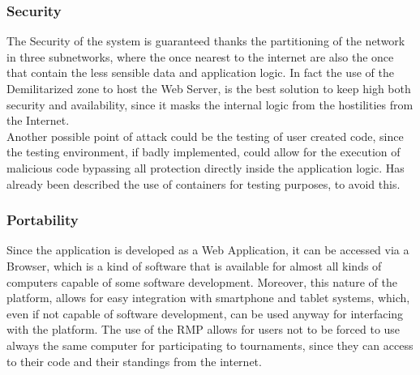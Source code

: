 \subsubsection{Security}
The Security of the system is guaranteed thanks the partitioning of the network in three subnetworks, where the once nearest to the internet are also the once that contain the less sensible data and application logic. In fact the use of the Demilitarized zone to host the Web Server, is the best solution to keep high both security and availability, since it masks the internal logic from the hostilities from the Internet.\\ 
Another possible point of attack could be the testing of user created code, since the testing environment, if badly implemented, could allow for the execution of malicious code bypassing all protection directly inside the application logic. 
Has already been described the use of containers for testing purposes, to avoid this.
\subsubsection{Portability}
Since the application is developed as a Web Application, it can be accessed via a Browser, which is a kind of software that is available for almost all kinds of computers capable of some software development. 
Moreover, this nature of the platform, allows for easy integration with smartphone and tablet systems, which, even if not capable of software development, can be used anyway for interfacing with the platform.
The use of the RMP allows for users not to be forced to use always the same computer for participating to tournaments, since they can access to their code and their standings from the internet.